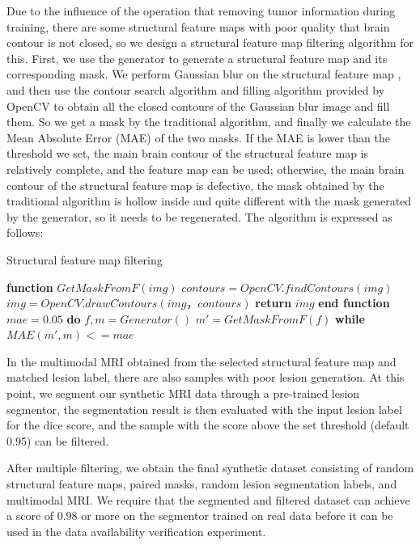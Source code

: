 \documentclass[letterpaper]{article} %
\begin{document}
Due to the influence of the operation that removing tumor information during training, there are some structural feature maps with poor quality that brain contour is not closed, so we design a structural feature map filtering algorithm for this. First, we use the generator to generate a structural feature map and its corresponding mask. We perform Gaussian blur\cite{92wink2004denoising} on the structural feature map , and then use the contour search algorithm and filling algorithm provided by OpenCV to obtain all the closed contours of the Gaussian blur image and fill them. So we get a mask by the traditional algorithm, and finally we calculate the Mean Absolute Error (MAE) of the two masks. If the MAE is lower than the threshold we set, the main brain contour of the structural feature map is relatively complete, and the feature map can be used; otherwise, the main brain contour of the structural feature map is defective, the mask obtained by the traditional algorithm is hollow inside and quite different with the mask generated by the generator, so it needs to be regenerated. The algorithm is expressed as follows:
\begin{algorithm}
	\caption{Structural feature map filtering}
	\label{alg:3}
	\begin{algorithmic}[1]
		\State \textbf{function} $GetMaskFromF(img)$
		\State \indent$contours = OpenCV.findContours(img)$
		\State \indent$img =OpenCV.drawContours(img，contours)$
		\State \indent\textbf{return} $img$
		\State \textbf{end function}
		\State
		\State $mae=0.05$
		\State \textbf{do} 
		\State \indent$f, m = Generator()$
		\State \indent$m'= GetMaskFromF(f)$
		\State \textbf{while} $MAE(m',m) <= mae$
	\end{algorithmic}  
\end{algorithm}

In the multimodal MRI obtained from the selected structural feature map and matched lesion label, there are also samples with poor lesion generation. At this point, we segment our synthetic MRI data through a pre-trained lesion segmentor, the segmentation result is then evaluated with the input lesion label for the dice score, and the sample with the score above the set threshold (default 0.95) can be filtered.

After multiple filtering, we obtain the final synthetic dataset consisting of random structural feature maps, paired masks, random lesion segmentation labels, and multimodal MRI. We require that the segmented and filtered dataset can achieve a score of 0.98 or more on the segmentor trained on real data before it can be used in the data availability verification experiment.
\end{document}
